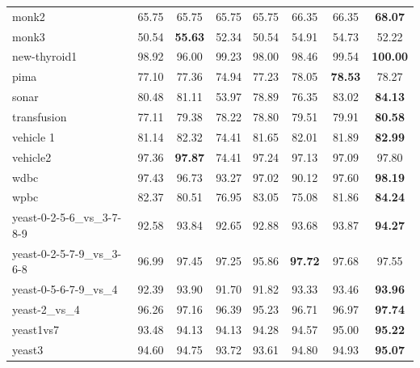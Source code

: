 \begin{table}[!p]
{\begin{tabular}{lccccccc}
monk2 & 65.75 & 65.75 & 65.75 & 65.75 & 66.35 & 66.35 & \textbf{68.07} \\
monk3 & 50.54 & \textbf{55.63} & 52.34 & 50.54 & 54.91 & 54.73 & 52.22 \\
new-thyroid1 & 98.92 & 96.00 & 99.23 & 98.00 & 98.46 & 99.54 & \textbf{100.00} \\
pima & 77.10 & 77.36 & 74.94 & 77.23 & 78.05 & \textbf{78.53} & 78.27 \\
sonar & 80.48 & 81.11 & 53.97 & 78.89 & 76.35 & 83.02 & \textbf{84.13} \\
transfusion & 77.11 & 79.38 & 78.22 & 78.80 & 79.51 & 79.91 & \textbf{80.58} \\
vehicle 1 & 81.14 & 82.32 & 74.41 & 81.65 & 82.01 & 81.89 & \textbf{82.99} \\
vehicle2 & 97.36 & \textbf{97.87} & 74.41 & 97.24 & 97.13 & 97.09 & 97.80 \\
wdbc & 97.43 & 96.73 & 93.27 & 97.02 & 90.12 & 97.60 & \textbf{98.19} \\
wpbc & 82.37 & 80.51 & 76.95 & 83.05 & 75.08 & 81.86 & \textbf{84.24} \\
yeast-0-2-5-6\_vs\_3-7-8-9 & 92.58 & 93.84 & 92.65 & 92.88 & 93.68 & 93.87 & \textbf{94.27} \\
yeast-0-2-5-7-9\_vs\_3-6-8 & 96.99 & 97.45 & 97.25 & 95.86 & \textbf{97.72} & 97.68 & 97.55 \\
yeast-0-5-6-7-9\_vs\_4 & 92.39 & 93.90 & 91.70 & 91.82 & 93.33 & 93.46 & \textbf{93.96} \\
yeast-2\_vs\_4 & 96.26 & 97.16 & 96.39 & 95.23 & 96.71 & 96.97 & \textbf{97.74} \\
yeast1vs7 & 93.48 & 94.13 & 94.13 & 94.28 & 94.57 & 95.00 & \textbf{95.22} \\
yeast3 & 94.60 & 94.75 & 93.72 & 93.61 & 94.80 & 94.93 & \textbf{95.07} \\
\bottomrule
\end{tabular}}
\end{table}
